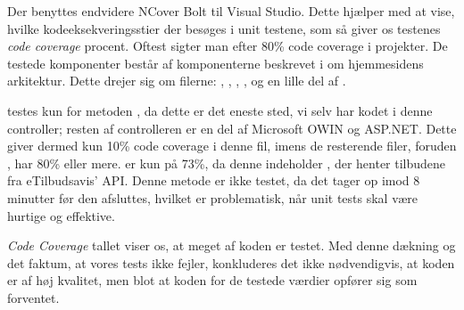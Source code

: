 Der benyttes endvidere NCover Bolt til Visual Studio. 
Dette hjælper med at vise, hvilke kodeeksekveringsstier der besøges i unit testene, som så giver os testenes \textit{code coverage} procent.
Oftest sigter man efter 80\% code coverage i projekter. \citep{Code_Coverage}
De testede komponenter består af komponenterne beskrevet i  om hjemmesidens arkitektur.
Dette drejer sig om filerne: , , , , og en lille del af .

 testes kun for metoden , da dette er det eneste sted, vi selv har kodet i denne controller; resten af controlleren er en del af Microsoft OWIN og ASP.NET.
Dette giver dermed kun 10\% code coverage i denne fil, imens de resterende filer, foruden , har 80\% eller mere.
 er kun på 73\%, da denne indeholder , der henter tilbudene fra eTilbudsavis' API. 
Denne metode er ikke testet, da det tager op imod 8 minutter før den afsluttes, hvilket er problematisk, når unit tests skal være hurtige og effektive.

\textit{Code Coverage} tallet viser os, at meget af koden er testet.
Med denne dækning og det faktum, at vores tests ikke fejler, konkluderes det ikke nødvendigvis, at koden er af høj kvalitet, men blot at koden for de testede værdier opfører sig som forventet.
